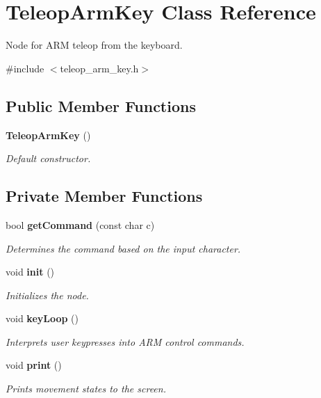 \section{\-Teleop\-Arm\-Key \-Class \-Reference}
\label{classTeleopArmKey}


\-Node for \-A\-R\-M teleop from the keyboard.  




{\ttfamily \#include $<$teleop\-\_\-arm\-\_\-key.\-h$>$}

\subsection*{\-Public \-Member \-Functions}
\begin{DoxyCompactItemize}
\item 
{\bf \-Teleop\-Arm\-Key} ()
\begin{DoxyCompactList}\small\item\em \-Default constructor. \end{DoxyCompactList}\end{DoxyCompactItemize}
\subsection*{\-Private \-Member \-Functions}
\begin{DoxyCompactItemize}
\item 
bool {\bf get\-Command} (const char c)
\begin{DoxyCompactList}\small\item\em \-Determines the command based on the input character. \end{DoxyCompactList}\item 
void {\bf init} ()
\begin{DoxyCompactList}\small\item\em \-Initializes the node. \end{DoxyCompactList}\item 
void {\bf key\-Loop} ()
\begin{DoxyCompactList}\small\item\em \-Interprets user keypresses into \-A\-R\-M control commands. \end{DoxyCompactList}\item 
void {\bf print} ()
\begin{DoxyCompactList}\small\item\em \-Prints movement states to the screen. \end{DoxyCompactList}\end{DoxyCompactItemize}
